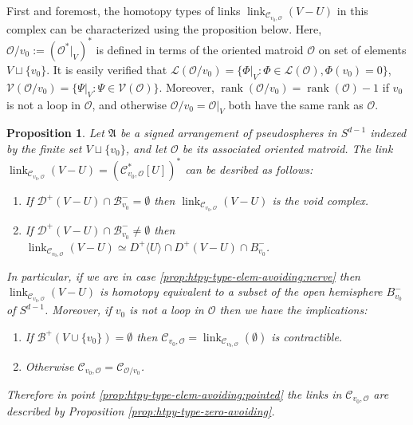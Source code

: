 \documentclass[a4paper,11pt,reqno, english]{amsart}
\newtheorem{proposition}[theorem]{Proposition}
\theoremstyle{definition}
\theoremstyle{remark}
\DeclareMathOperator{\link}{\mathrm{link}}
\begin{document}
First and foremost, the homotopy types of links $\link_{\mathscr{C}_{v_0,\mathscr{O}}}(V-U)$ in this complex can be characterized using the proposition below. Here, $\mathscr{O}/v_0:=(\mathscr{O}^*|_{V})^*$ is defined in terms of the oriented matroid $\mathscr{O}$ on set of elements $V\sqcup\{v_0\}$. It is easily verified that $\mathscr{L}(\mathscr{O}/v_0)=\{\Phi|_V:\Phi\in\mathscr{L}(\mathscr{O}),\Phi(v_0)=0\}$, $\mathscr{V}(\mathscr{O}/v_0)=\{\Psi|_V:\Psi\in\mathscr{V}(\mathscr{O})\}$. Moreover, $\operatorname{rank}(\mathscr{O}/v_0)=\operatorname{rank}(\mathscr{O})-1$ if $v_0$ is not a loop in $\mathscr{O}$, and otherwise $\mathscr{O}/v_0=\mathscr{O}|_V$ both have the same rank as $\mathscr{O}$.
\begin{proposition}\label{prop:htpy-type-elem-avoiding}
    Let $\mathfrak{A}$ be a signed arrangement of pseudospheres in $S^{d-1}$ indexed by the finite set $V\sqcup\{v_0\}$, and let $\mathscr{O}$ be its associated oriented matroid. The link $\link_{\mathscr{C}_{v_0,\mathscr{O}}}(V-U)=(\mathscr{C}_{v_0,\mathscr{O}}^*[U])^*$ can be desribed as follows:
    \begin{enumerate}[label=\normalfont{(\arabic*)}]
        \item\label{prop:htpy-type-elem-avoiding:void} If $\mathscr{D}^+(V-U)\cap\mathscr{B}^-_{v_0}=\emptyset$ then $\link_{\mathscr{C}_{v_0,\mathscr{O}}}(V-U)$ is the void complex.
        \item\label{prop:htpy-type-elem-avoiding:nerve} If $\mathscr{D}^+(V-U)\cap\mathscr{B}^-_{v_0}\neq\emptyset$ then $\link_{\mathscr{C}_{v_0,\mathscr{O}}}(V-U)\simeq D^+\langle U\rangle\cap D^+(V-U)\cap B^-_{v_0}$.
    \end{enumerate}
    In particular, if we are in case \ref{prop:htpy-type-elem-avoiding:nerve} then $\link_{\mathscr{C}_{v_0,\mathscr{O}}}(V-U)$ is homotopy equivalent to a subset of the open hemisphere $B^-_{v_0}$ of $S^{d-1}$. Moreover, if $v_0$ is not a loop in $\mathscr{O}$ then we have the implications:
    \begin{enumerate}[label=\normalfont{(2.\arabic*)}]
        \item\label{prop:htpy-type-elem-avoiding:nonpointed} If $\mathscr{B}^+(V\cup\{v_0\})=\emptyset$ then $\mathscr{C}_{v_0,\mathscr{O}}=\link_{\mathscr{C}_{v_0,\mathscr{O}}}(\emptyset)$ is contractible.
        \item\label{prop:htpy-type-elem-avoiding:pointed} Otherwise $\mathscr{C}_{v_0,\mathscr{O}}=\mathscr{C}_{\mathscr{O}/v_0}$.
    \end{enumerate}
    Therefore in point \ref{prop:htpy-type-elem-avoiding:pointed} the links in $\mathscr{C}_{v_0,\mathscr{O}}$ are described by Proposition \ref{prop:htpy-type-zero-avoiding}.
\end{proposition}
\end{document}
